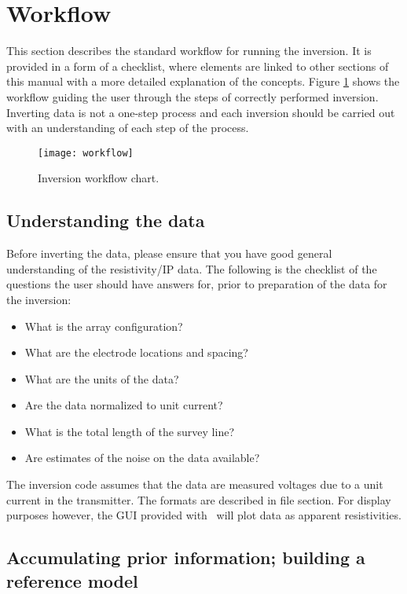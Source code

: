 \section{Workflow}
This section describes the standard workflow for running the  inversion. It is provided in a form of a checklist, where elements are linked to other sections of this manual with a more detailed explanation of the concepts. Figure \ref{fig:workflow} shows the workflow guiding the user through the steps of correctly performed inversion. Inverting data is not a one-step process and each inversion should be carried out with an understanding of each step of the process.
%
\begin{figure}[hb]
\centering
\texttt{[image: workflow]}
\caption{Inversion workflow chart.}
\label{fig:workflow}
\end{figure}

\subsection{Understanding the data}
Before inverting the data, please ensure that you have good general understanding of the resistivity/IP data. The following is the checklist of the questions the user should have answers for, prior to preparation of the data for the inversion:
%
\begin{itemize}
\item What is the array configuration?
\item What are the electrode locations and spacing?
\item What are the units of the data?
\item Are the data normalized to unit current?
\item What is the total length of the survey line?
\item Are estimates of the noise on the data available?
\end{itemize}
%
The inversion code assumes that the data are measured voltages due to a unit current in the transmitter. The formats are described in  file section. For display purposes however, the  GUI provided with \prog~will plot data as apparent resistivities.

\subsection{Accumulating prior information; building a reference model}

